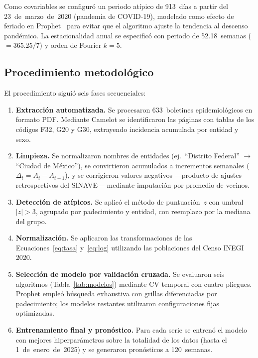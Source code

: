 \documentclass[12pt,a4paper]{article}
\begin{document}
Como covariables se configuró un periodo atípico de 913~días a partir del 23~de~marzo~de~2020 (pandemia de COVID-19), modelado como efecto de feriado en Prophet~\cite{taylor2018} para evitar que el algoritmo ajuste la tendencia al descenso pandémico. La estacionalidad anual se especificó con periodo de 52.18~semanas ($= 365.25 / 7$) y orden de Fourier $k = 5$.

\subsection*{Procedimiento metodológico}

El procedimiento siguió seis fases secuenciales:

\begin{enumerate}
    \item \textbf{Extracción automatizada.} Se procesaron 633~boletines epidemiológicos en formato PDF. Mediante Camelot se identificaron las páginas con tablas de los códigos F32, G20 y G30, extrayendo incidencia acumulada por entidad y sexo.

    \item \textbf{Limpieza.} Se normalizaron nombres de entidades (ej.\ ``Distrito Federal'' $\rightarrow$ ``Ciudad de México''), se convirtieron acumulados a incrementos semanales ($\Delta_t = A_t - A_{t-1}$), y se corrigieron valores negativos ---producto de ajustes retrospectivos del SINAVE--- mediante imputación por promedio de vecinos.

    \item \textbf{Detección de atípicos.} Se aplicó el método de puntuación~$z$ con umbral $|z| > 3$, agrupado por padecimiento y entidad, con reemplazo por la mediana del grupo.

    \item \textbf{Normalización.} Se aplicaron las transformaciones de las Ecuaciones~\ref{eq:tasa} y~\ref{eq:log} utilizando las poblaciones del Censo INEGI 2020.~\cite{inegi2020}

    \item \textbf{Selección de modelo por validación cruzada.} Se evaluaron seis algoritmos (Tabla~\ref{tab:modelos}) mediante CV temporal con cuatro pliegues. Prophet empleó búsqueda exhaustiva con grillas diferenciadas por padecimiento; los modelos restantes utilizaron configuraciones fijas optimizadas.

    \item \textbf{Entrenamiento final y pronóstico.} Para cada serie se entrenó el modelo con mejores hiperparámetros sobre la totalidad de los datos (hasta el 1~de~enero~de~2025) y se generaron pronósticos a 120~semanas.
\end{enumerate}
\end{document}
